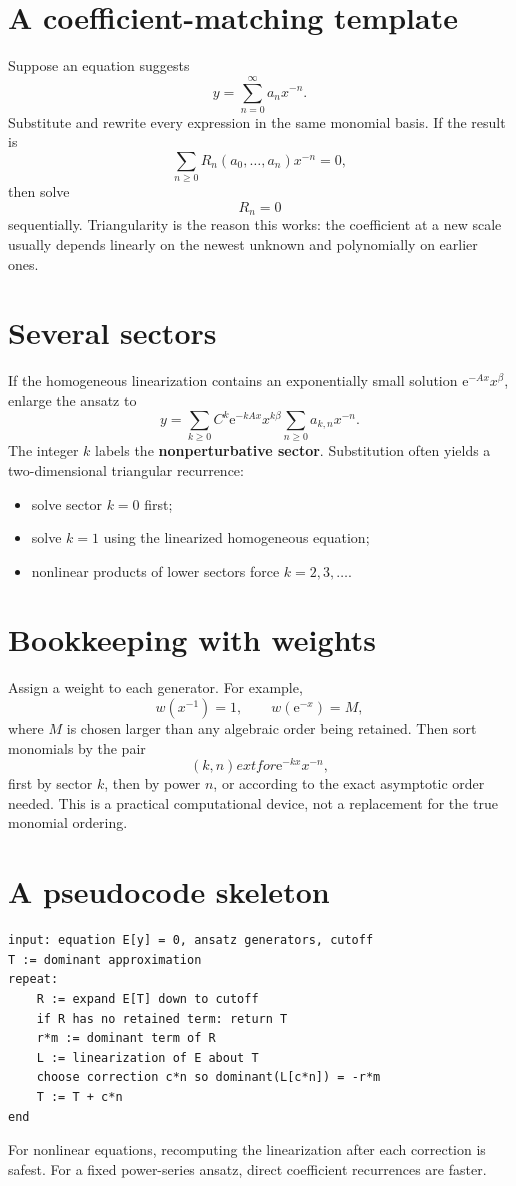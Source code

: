 \documentclass[11pt,openany]{book}
\theoremstyle{plain}
\theoremstyle{definition}
\theoremstyle{remark}
\newcommand{\e}{\mathrm{e}}
\newcommand{\defterm}[1]{\textbf{#1}}
\begin{document}
\section{A coefficient-matching template}
Suppose an equation suggests
\[
  y=\sum_{n=0}^{\infty}a_nx^{-n}.
\]
Substitute and rewrite every expression in the same monomial basis. If the result is
\[
  \sum_{n\ge0}R_n(a_0,\ldots,a_n)x^{-n}=0,
\]
then solve
\[
  R_n=0
\]
sequentially. Triangularity is the reason this works: the coefficient at a new scale usually depends linearly on the newest unknown and polynomially on earlier ones.

\section{Several sectors}
If the homogeneous linearization contains an exponentially small solution $\e^{-Ax}x^\beta$, enlarge the ansatz to
\[
  y=\sum_{k\ge0}C^k\e^{-kAx}x^{k\beta}
    \sum_{n\ge0}a_{k,n}x^{-n}.
\]
The integer $k$ labels the \defterm{nonperturbative sector}. Substitution often yields a two-dimensional triangular recurrence:
\begin{itemize}
\item solve sector $k=0$ first;
\item solve $k=1$ using the linearized homogeneous equation;
\item nonlinear products of lower sectors force $k=2,3,\ldots$.
\end{itemize}

\section{Bookkeeping with weights}
Assign a weight to each generator. For example,
\[
  w(x^{-1})=1,
  \qquad
  w(\e^{-x})=M,
\]
where $M$ is chosen larger than any algebraic order being retained. Then sort monomials by the pair
\[
  (k,n)	ext{ for }\e^{-kx}x^{-n},
\]
first by sector $k$, then by power $n$, or according to the exact asymptotic order needed. This is a practical computational device, not a replacement for the true monomial ordering.

\section{A pseudocode skeleton}
\begin{verbatim}
input: equation E[y] = 0, ansatz generators, cutoff
T := dominant approximation
repeat:
    R := expand E[T] down to cutoff
    if R has no retained term: return T
    r*m := dominant term of R
    L := linearization of E about T
    choose correction c*n so dominant(L[c*n]) = -r*m
    T := T + c*n
end
\end{verbatim}
For nonlinear equations, recomputing the linearization after each correction is safest. For a fixed power-series ansatz, direct coefficient recurrences are faster.
\end{document}
